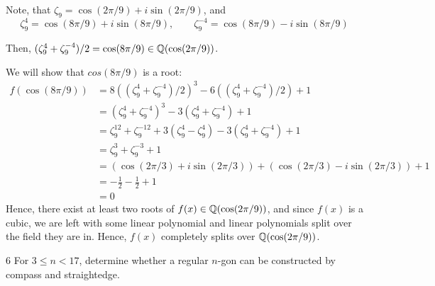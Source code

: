 \documentclass[12pt]{article}
\begin{document}
\begin{solution}
\begin{enumerate}
    Note, that $\zeta_9 = \cos(2\pi/9) + i\sin(2\pi/9)$, and 
    \[\zeta_9^4 = \cos(8\pi/9) + i\sin(8\pi/9), \qquad \zeta^{-4}_9 =  \cos(8\pi/9) - i\sin(8\pi/9)\]

    Then, $({\zeta^4_9 + \zeta^{-4}_9})/2 = \cos(8\pi/9) \in \mathbb Q(\cos(2\pi/9))$. 

    We will show that $cos(8\pi/9)$ is a root: 
    \begin{align*}
        f(\cos(8\pi/9)) &= 8(({\zeta^4_9 + \zeta^{-4}_9})/2)^3 - 6(({\zeta^4_9 + \zeta^{-4}_9})/2) + 1 \\
        &= (\zeta^4_9 + \zeta^{-4}_9)^3 - 3(\zeta^4_9 + \zeta^{-4}_9) +1\\ 
        &= \zeta^{12}_9 + \zeta^{-12}_9 + 3(\zeta^4_9 - \zeta^4_9) - 3(\zeta^4_9 + \zeta^{-4}_9) +1 \\ 
        &= \zeta^{3}_9 + \zeta^{-3}_9 +1 \\ 
        &= (\cos(2\pi/3) + i\sin(2\pi/3)) + (\cos(2\pi/3) - i\sin(2\pi/3)) +1 \\ 
        &= -\frac{1}{2} - \frac{1}{2} + 1 \\ 
        &= 0 
    \end{align*}
    Hence, there exist at least two roots of $f(x) \in \mathbb Q(\cos(2\pi/9))$, and since $f(x)$ is a cubic, we are left with some linear polynomial and linear polynomials split over the field they are in. Hence, $f(x)$ completely splits over $\mathbb Q(\cos(2\pi/9))$. 
    \end{enumerate}
\end{solution}

\newpage 

\begin{problem}{6}
    For $3 \le n < 17$, determine whether a regular $n$-gon can be constructed by compass and straightedge. 
\end{problem}
\end{document}
